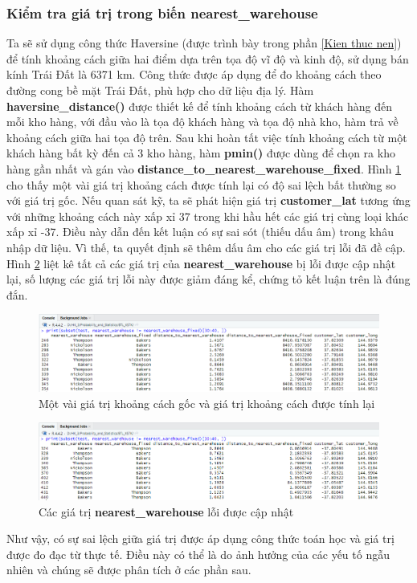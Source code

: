 \subsubsection{Kiểm tra giá trị trong biến nearest\_warehouse}
Ta sẽ sử dụng công thức Haversine (được trình bày trong phần \ref{Kien thuc nen}) để tính khoảng cách giữa hai điểm dựa trên tọa độ vĩ độ và kinh độ, sử dụng bán kính Trái Đất là 6371 km. Công thức được áp dụng để đo khoảng cách theo đường cong bề mặt Trái Đất, phù hợp cho dữ liệu địa lý. Hàm \textbf{haversine\_distance()} được thiết kế để tính khoảng cách từ khách hàng đến mỗi kho hàng, với đầu vào là tọa độ khách hàng và tọa độ nhà kho, hàm trả về khoảng cách giữa hai tọa độ trên. Sau khi hoàn tất việc tính khoảng cách từ một khách hàng bất kỳ đến cả 3 kho hàng, hàm \textbf{pmin()} được dùng để chọn ra kho hàng gần nhất và gán vào \textbf{distance\_to\_nearest\_warehouse\_fixed}. Hình \ref{f6} cho thấy một vài giá trị khoảng cách được tính lại có độ sai lệch bất thường so với giá trị gốc. Nếu quan sát kỹ, ta sẽ phát hiện giá trị \textbf{customer\_lat} tương ứng với những khoảng cách này xấp xỉ 37 trong khi hầu hết các giá trị cùng loại khác xấp xỉ -37. Điều này dẫn đến kết luận có sự sai sót (thiếu dấu âm) trong khâu nhập dữ liệu. Vì thế, ta quyết định sẽ thêm dấu âm cho các giá trị lỗi đã đề cập. Hình \ref{f7} liệt kê tất cả các giá trị của \textbf{nearest\_warehouse} bị lỗi được cập nhật lại, số lượng các giá trị lỗi này được giảm đáng kể, chứng tỏ kết luận trên là đúng đắn.
\begin{figure}[!htbp]
    \centering
    \includegraphics[width=\textwidth]{graphics/Pre_processing_data/f6.PNG}
    \caption{Một vài giá trị khoảng cách gốc và giá trị khoảng cách được tính lại}
    \label{f6}
\end{figure}
\begin{figure}[!htbp]
    \centering
    \includegraphics[width=\textwidth]{graphics/Pre_processing_data/f7.PNG}
    \caption{Các giá trị \textbf{nearest\_warehouse} lỗi được cập nhật}
    \label{f7}
\end{figure}

Như vậy, có sự sai lệch giữa giá trị được áp dụng công thức toán học và giá trị được đo đạc từ thực tế. Điều này có thể là do ảnh hưởng của các yếu tố ngẫu nhiên và chúng sẽ được phân tích ở các phần sau.